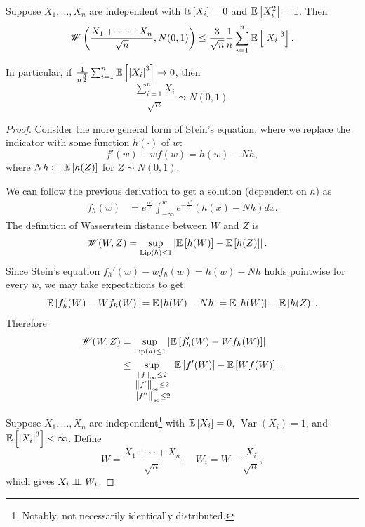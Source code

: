 \begin{theorem} \label{2-19-1}
	Suppose $X_1,\ldots,X_n$ are independent with $\mathbb{E}\left[X_i \right] = 0$ and $\mathbb{E}\left[X_i^2\right] = 1$. Then \[
		\mathscr{W}\left( \frac{X_1+ \cdots + X_n}{\sqrt{n}}, N(0,1) \right) \le \frac{3}{\sqrt{n} } \frac{1}{n} \sum\limits_{i=1}^{n} \mathbb{E}\left[\left| X_i \right|^3\right] 
	.\] 

	In particular, if $\frac{1}{n^{\frac{3}{2}}} \sum_{i=1}^{n} \mathbb{E}\left[\left| X_i \right|^3\right] \to 0$, then \[
		\frac{\sum_{i=1}^{n} X_i}{\sqrt{n}} \leadsto N(0,1)
	.\] 
\end{theorem}

\begin{proof}
	Consider the more general form of Stein's equation, where we replace the indicator with some function $h(\cdot )$ of $w$:
	\[
		f'(w) - wf(w) = h(w) - Nh
		,\] where $Nh \coloneqq \mathbb{E}\left[h(Z)\right] $ for $Z \sim N(0,1)$.

	We can follow the previous derivation to get a solution (dependent on $h$) as \begin{align*}
		f_h(w) &= e^{\frac{w^2}{2}} \int_{-\infty}^{w} e^{-\frac{x^2}{2}} \left( h(x) - Nh \right)dx
	.\end{align*}
	The definition of Wasserstein distance between $W$ and $Z$ is
	\begin{align*}
		\mathscr{W}(W,Z)
		&= \sup_{\operatorname{Lip}(h) \le 1} \left| \mathbb{E}\left[h(W)\right] - \mathbb{E}\left[h(Z)\right]  \right|
	.\end{align*}
	Since Stein's equation $f_h'(w) - wf_h(w) = h(w) - Nh$ holds pointwise for every $w$, we may take expectations to get
	\[
		\mathbb{E}\left[f_h'(W) - Wf_h(W)\right] = \mathbb{E}\left[h(W) - Nh\right] = \mathbb{E}\left[h(W)\right] - \mathbb{E}\left[h(Z)\right].
	\]
	Therefore
	\begin{align*}
		\mathscr{W}(W,Z)
		&= \sup_{\operatorname{Lip}(h) \le 1} \left| \mathbb{E}\left[f_h'(W) - W f_h(W)\right]  \right| \\
		&\le \sup_{\substack{\left\|f\right\|_{\infty} \le 2 \\ \left\|f'\right\|_{\infty} \le 2 \\ \left\|f''\right\|_{\infty}\le 2}} \left| \mathbb{E}\left[f'(W)\right] - \mathbb{E}\left[W f(W)\right]  \right|
	.\end{align*}

	Suppose $X_1,\ldots,X_n$ are independent\footnote{Notably, not necessarily identically distributed.} with $\mathbb{E}\left[X_i\right] =0$, $\operatorname{Var}\left(X_i\right) = 1$, and $\mathbb{E}\left[\left| X_i \right|^3\right] < \infty$. Define \[
		W = \frac{X_1 + \cdots + X_n}{\sqrt{n} }, \quad W_i = W - \frac{X_i}{\sqrt{n} }	
	,\] 
	which gives $X_i \perp\!\!\!\perp W_i$.


\end{proof}
